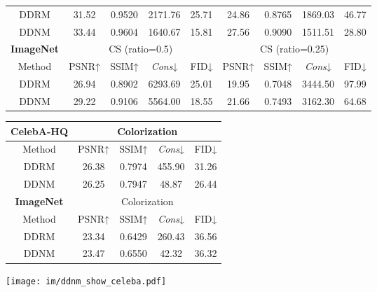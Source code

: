 \documentclass{article} \usepackage{iclr2023_conference,times}
\begin{document}
\begin{table*}[h]
\begin{tabular}{c | cccc | cccc}
            \rule{0pt}{10pt}{DDRM} &31.52&0.9520&2171.76&25.71 & 24.86&0.8765&1869.03&46.77\\
            \rule{0pt}{10pt}{DDNM} & 33.44&0.9604&1640.67&15.81 & 27.56&0.9090&1511.51&28.80\\
        \hline
        \hline
           \multicolumn{1}{c}{\rule{0pt}{10pt}\tiny\textbf{ImageNet}}&\multicolumn{4}{c}{CS (ratio=0.5)} &\multicolumn{4}{c}{CS (ratio=0.25)}\\
        \hline
           \rule{0pt}{10pt}Method& PSNR↑&SSIM↑& \textit{Cons}↓&FID↓ &  PSNR↑&SSIM↑&  \textit{Cons}↓ &FID↓ \\
        \hline
            \rule{0pt}{10pt}{DDRM} &26.94&0.8902&6293.69&25.01 & 19.95&0.7048&3444.50&97.99\\
            \rule{0pt}{10pt}{DDNM} &29.22&0.9106&5564.00&18.55 & 21.66&0.7493&3162.30&64.68\\
        \hline
    \end{tabular}
    \begin{tabular}{c | cccc }
    \hline
           \multicolumn{1}{c}{\rule{0pt}{10pt}\tiny\textbf{CelebA-HQ}}&\multicolumn{4}{c}{Colorization} \\
        \hline
           \rule{0pt}{10pt}Method& PSNR↑&SSIM↑& \textit{Cons}↓&FID↓ \\
        \hline
            \rule{0pt}{10pt}{DDRM} &26.38&0.7974&455.90&31.26\\
            \rule{0pt}{10pt}{DDNM} & 26.25&0.7947&48.87&26.44\\
        \hline
        \hline
           \multicolumn{1}{c}{\rule{0pt}{10pt}\tiny\textbf{ImageNet}}&\multicolumn{4}{c}{Colorization} \\
        \hline
           \rule{0pt}{10pt}Method& PSNR↑&SSIM↑& \textit{Cons}↓&FID↓ \\
        \hline
            \rule{0pt}{10pt}{DDRM} &23.34&0.6429&260.43&36.56\\
            \rule{0pt}{10pt}{DDNM} &23.47&0.6550&42.32&36.32\\
        \hline
    \end{tabular}
    \caption{Comprehensive quantitative comparisons between DDNM and DDRM.}
    \label{tb:ddnm appendix big table}
\end{table*}



\begin{figure*}[t]
  \centering
  \vspace{-0.2cm}
  \texttt{[image: im/ddnm\_show\_celeba.pdf]}
  \vspace{-0.3cm}
  \caption{Image restoration results of DDNM on CelebA.}
\label{fig:ddnm_show_celeba} 
\end{figure*}
\end{document}
